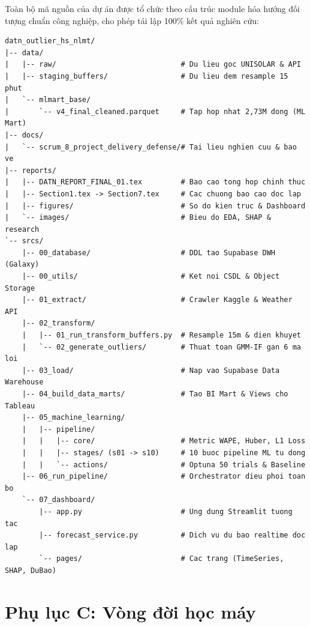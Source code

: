 \documentclass[12pt, a4paper]{report}
\begin{document}
Toàn bộ mã nguồn của dự án được tổ chức theo cấu trúc module hóa hướng đối tượng chuẩn công nghiệp, cho phép tái lập 100\% kết quả nghiên cứu:

\begin{lstlisting}[basicstyle=\ttfamily\scriptsize, breaklines=false, numbers=none, caption={Sơ đồ cấu trúc cây thư mục mã nguồn của dự án The Outliers}]
datn_outlier_hs_nlmt/
|-- data/
|   |-- raw/                             # Du lieu goc UNISOLAR & API
|   |-- staging_buffers/                 # Du lieu dem resample 15 phut
|   `-- mlmart_base/
|       `-- v4_final_cleaned.parquet     # Tap hop nhat 2,73M dong (ML Mart)
|-- docs/
|   `-- scrum_8_project_delivery_defense/# Tai lieu nghien cuu & bao ve
|-- reports/
|   |-- DATN_REPORT_FINAL_01.tex         # Bao cao tong hop chinh thuc
|   |-- Section1.tex -> Section7.tex     # Cac chuong bao cao doc lap
|   |-- figures/                         # So do kien truc & Dashboard
|   `-- images/                          # Bieu do EDA, SHAP & research
`-- srcs/
    |-- 00_database/                     # DDL tao Supabase DWH (Galaxy)
    |-- 00_utils/                        # Ket noi CSDL & Object Storage
    |-- 01_extract/                      # Crawler Kaggle & Weather API
    |-- 02_transform/
    |   |-- 01_run_transform_buffers.py  # Resample 15m & dien khuyet
    |   `-- 02_generate_outliers/        # Thuat toan GMM-IF gan 6 ma loi
    |-- 03_load/                         # Nap vao Supabase Data Warehouse
    |-- 04_build_data_marts/             # Tao BI Mart & Views cho Tableau
    |-- 05_machine_learning/
    |   |-- pipeline/
    |   |   |-- core/                    # Metric WAPE, Huber, L1 Loss
    |   |   |-- stages/ (s01 -> s10)     # 10 buoc pipeline ML tu dong
    |   |   `-- actions/                 # Optuna 50 trials & Baseline
    |-- 06_run_pipeline/                 # Orchestrator dieu phoi toan bo
    `-- 07_dashboard/
        |-- app.py                       # Ung dung Streamlit tuong tac
        |-- forecast_service.py          # Dich vu du bao realtime doc lap
        `-- pages/                       # Cac trang (TimeSeries, SHAP, DuBao)
\end{lstlisting}


\chapter*{Phụ lục C: Vòng đời học máy}
\label{app:ml_lifecycle_en}
\end{document}
